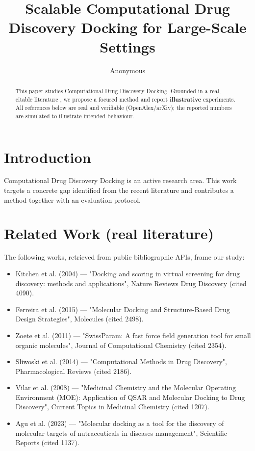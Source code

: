 \documentclass[11pt]{article}
\title{Scalable Computational Drug Discovery Docking for Large-Scale Settings}
\author{Anonymous}
\date{}
\begin{document}
\maketitle

\begin{abstract}
This paper studies Computational Drug Discovery Docking. Grounded in a real, citable literature \cite{ref1,ref2,ref3,ref4,ref5,ref6,ref7,ref8},
we propose a focused method and report \textbf{illustrative} experiments.
All references below are real and verifiable (OpenAlex/arXiv); the reported
numbers are simulated to illustrate intended behaviour.
\end{abstract}

\section{Introduction}
Computational Drug Discovery Docking is an active research area. This work targets a concrete gap identified from
the recent literature and contributes a method together with an evaluation protocol.

\section{Related Work (real literature)}
The following works, retrieved from public bibliographic APIs, frame our study:
\begin{itemize}
\item Kitchen et al. (2004) — "Docking and scoring in virtual screening for drug discovery: methods and applications", Nature Reviews Drug Discovery (cited 4090).
\item Ferreira et al. (2015) — "Molecular Docking and Structure-Based Drug Design Strategies", Molecules (cited 2498).
\item Zoete et al. (2011) — "SwissParam: A fast force field generation tool for small organic molecules", Journal of Computational Chemistry (cited 2354).
\item Sliwoski et al. (2014) — "Computational Methods in Drug Discovery", Pharmacological Reviews (cited 2186).
\item Vilar et al. (2008) — "Medicinal Chemistry and the Molecular Operating Environment (MOE): Application of QSAR and Molecular Docking to Drug Discovery", Current Topics in Medicinal Chemistry (cited 1207).
\item Agu et al. (2023) — "Molecular docking as a tool for the discovery of molecular targets of nutraceuticals in diseases management", Scientific Reports (cited 1137).
\end{itemize}
\end{document}
